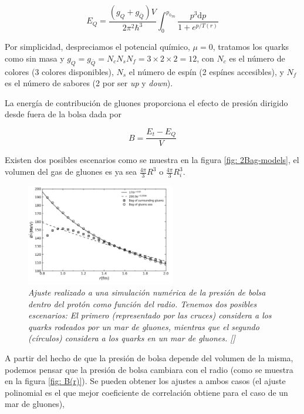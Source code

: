 \begin{equation}
{E}_{Q} = \frac{\left({g}_{Q} + {g}_{\bar{Q}} \right) V}{2{\pi}^{2}{\hbar}^{3}} \int_{0}^{{{p}_{0}}_{m}} \frac{{p}^{3} \mathrm{d}p}{1 + {e}^{p/T(r)}}
\end{equation}

Por simplicidad, despreciamos el potencial químico, $\mu=0$, tratamos los quarks como sin masa y ${g}_{Q} = {g}_{\bar{Q}} = {N}_{c}{N}_{s}{N}_{f} = 3 \times 2 \times 2 = 12$, con ${N}_{c}$ es el número de colores (3 colores disponibles), ${N}_{s}$ el número de espín (2 espínes accesibles), y ${N}_{f}$ es el número de sabores (2 por ser \emph{up} y \emph{down}).


La energía de contribución de gluones proporciona el efecto de presión dirigido desde fuera de la bolsa dada por

\begin{equation}
B = \frac{{E}_{t} - {E}_{Q}}{V}
\end{equation}

Existen dos posibles escenarios como se muestra en la figura \ref{fig: 2Bag-models}, el volumen del gas de gluones es ya sea $\frac{4 \pi}{3} {R}^{3}$ o $\frac{4\pi}{3}{R}_{i}^{3}$.

\begin{figure}
\centering\includegraphics[width=0.58\textwidth]{./Images/B(R).png}

\caption[Presión de bolsa como función del radio del protón]{\emph{Ajuste realizado a una simulación numérica de la presión de bolsa dentro del protón como función del radio. Tenemos dos posibles escenarios: El primero (representado por las cruces) considera a los quarks rodeados por un mar de gluones, mientras que el segundo (círculos) considera a los quarks en un mar de gluones. []}}
\label{fig: B(r)}
\end{figure}

A partir del hecho de que la presión de bolsa depende del volumen de la misma, podemos pensar que la presión de bolsa cambiara con el radio (como se muestra en la figura \eqref{fig: B(r)}). Se pueden obtener los ajustes a ambos casos (el ajuste polinomial es el que mejor coeficiente de correlación obtiene para el caso de un mar de gluones), 

